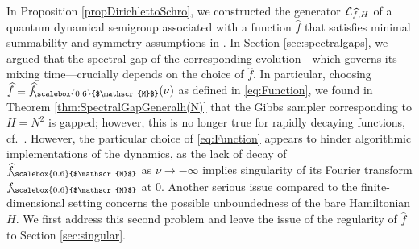 \documentclass[11pt]{amsart}
\newcommand{\1}{\mathbbm{1}}
\newcommand{\cL}{\mathcal{L}}
\newcommand{\hatfM}{\widehat{f}_{\!\scalebox{0.6}{$\mathscr{M}$}}
}
\newcommand{\fM}{f_{\!\scalebox{0.6}{$\mathscr{M}$}}
}
\theoremstyle{plain}
\theoremstyle{definition}
\theoremstyle{remark}
\numberwithin{equation}{section}
\begin{document}
\noindent In Proposition \ref{propDirichlettoSchro}, we constructed the generator $\cL_{\smash{\widehat{f},H}}$ of a quantum dynamical semigroup associated with a function $\widehat{f}$ that satisfies minimal summability and symmetry assumptions in . In Section \ref{sec:spectralgaps}, we argued that the spectral gap of the corresponding evolution—which governs its mixing time—crucially depends on the choice of $\widehat{f}$. In particular, choosing $\widehat{f}\equiv 
    \hatfM(\nu)$ as defined in \eqref{eq:Function}, we found in Theorem \ref{thm:SpectralGapGeneralh(N)} that the Gibbs sampler corresponding to $H = N^2$ is gapped; however, this is no longer true for rapidly decaying functions, cf.~. However, the particular choice of \eqref{eq:Function} appears to hinder algorithmic implementations of the dynamics, as the lack of decay of $\hatfM$ as $\nu\to-\infty$ implies singularity of its Fourier transform $\fM$ at $0$. Another serious issue compared to the finite-dimensional setting concerns the possible unboundedness of the bare Hamiltonian $H$. 
We first address this second problem and leave the issue of the regularity of $\widehat{f}$ to Section \ref{sec:singular}.
\end{document}
